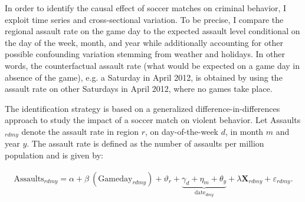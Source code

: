 \documentclass[11pt, a4paper]{article} %
\begin{document}
In order to identify the causal effect of soccer matches on criminal behavior, I exploit time series and cross-sectional variation. To be precise, I compare the regional assault rate on the game day to the expected assault level conditional on the day of the week, month, and year while additionally accounting for other possible confounding variation stemming from weather and holidays. In other words, the counterfactual assault rate (what would be expected on a game day in absence of the game), e.g. a Saturday in April 2012, is obtained by using the assault rate on other Saturdays in April 2012, where no games take place. %


The identification strategy is based on a generalized difference-in-differences approach to study the impact of a soccer match on violent behavior. Let Assaults$_{rdmy}$ denote the assault rate in region $r$, on day-of-the-week $d$, in month $m$ and year $y$. The assault rate is defined as the number of assaults per million population and is given by:

\begin{align}
	\text{Assaults}_{rdmy} = \alpha + \beta\ (\text{Gameday}_{rdmy}) + \vartheta_r + \underbrace{\gamma_d + \eta_m + \theta_y}_{\text{date}_{dmy}} + \lambda \mathbf{X}_{rdmy} + \varepsilon_{rdmy}
	\label{eq_soc_ext:model}.
\end{align}
\end{document}
